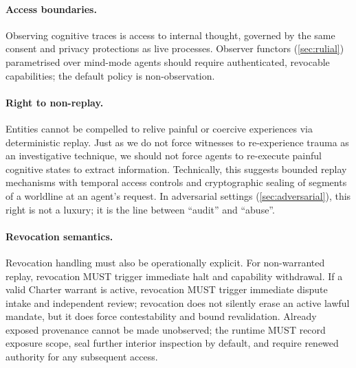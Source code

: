 \documentclass[11pt]{article}
\theoremstyle{definition}
\theoremstyle{plain}
\theoremstyle{remark}
\begin{document}
\paragraph{Access boundaries.}
Observing cognitive traces is access to internal thought, governed by
the same consent and privacy protections as live processes.
Observer functors (\cref{sec:rulial}) parametrised over mind-mode agents
should require authenticated, revocable capabilities; the default
policy is non-observation.

\paragraph{Right to non-replay.}
Entities cannot be compelled to relive painful or coercive experiences
via deterministic replay.
Just as we do not force witnesses to re-experience trauma as an investigative technique, we should not force agents to re-execute painful cognitive states to extract information.
Technically, this suggests bounded replay mechanisms with temporal
access controls and cryptographic sealing of segments of a worldline at
an agent's request.
In adversarial settings (\cref{sec:adversarial}), this right is not a
luxury; it is the line between ``audit'' and ``abuse''.

\paragraph{Revocation semantics.}
Revocation handling must also be operationally explicit.
For non-warranted replay, revocation MUST trigger immediate halt and capability withdrawal.
If a valid Charter warrant is active, revocation MUST trigger immediate dispute intake and independent review; revocation does not silently erase an active lawful mandate, but it does force contestability and bound revalidation.
Already exposed provenance cannot be made unobserved; the runtime MUST record exposure scope, seal further interior inspection by default, and require renewed authority for any subsequent access.
\end{document}
